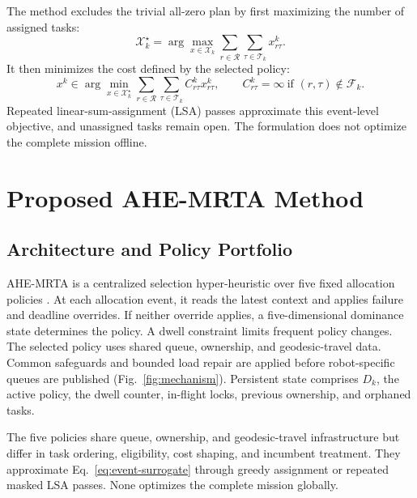 \documentclass[10pt,letterpaper,onecolumn]{IEEEtran}
\begin{document}
The method excludes the trivial all-zero plan by first maximizing the number
of assigned tasks:
\begin{equation}
  \mathcal X_k^\star=\arg\max_{x\in\mathcal X_k}
  \sum_{r\in\mathcal R}\sum_{\tau\in\mathcal T_k}x_{r\tau}^k.
  \label{eq:max-cardinality}
\end{equation}
It then minimizes the cost defined by the selected policy:
\begin{equation}
  x^k\in\arg\min_{x\in\mathcal{X}_k^\star}
        \sum_{r\in\mathcal{R}}\sum_{\tau\in\mathcal{T}_k}
        C_{r\tau}^k x_{r\tau}^k ,
  \qquad C_{r\tau}^k=\infty\ \text{if }(r,\tau)\notin\mathcal{F}_k .
  \label{eq:event-surrogate}
\end{equation}
Repeated linear-sum-assignment (LSA) passes approximate this event-level
objective, and unassigned tasks remain open. The formulation does not optimize
the complete mission offline.

\section{Proposed AHE-MRTA Method}
\label{sec:method}

\subsection{Architecture and Policy Portfolio}
\label{sec:method-overview}

AHE-MRTA is a centralized selection hyper-heuristic over five fixed allocation
policies \cite{burke2013hyper}. At each allocation event, it reads the latest
context and applies failure and deadline overrides. If neither override
applies, a five-dimensional dominance state determines the policy. A dwell
constraint limits frequent policy changes. The selected policy uses shared
queue, ownership, and geodesic-travel data. Common safeguards and bounded load
repair are applied before robot-specific queues are published
(Fig.~\ref{fig:mechanism}). Persistent state comprises $D_k$, the active
policy, the dwell counter, in-flight locks, previous ownership, and orphaned
tasks.

\label{sec:paradigms}

The five policies share queue, ownership, and geodesic-travel infrastructure
but differ in task ordering, eligibility, cost shaping, and incumbent
treatment. They approximate Eq.~\eqref{eq:event-surrogate} through greedy
assignment or repeated masked LSA passes. None optimizes the complete mission
globally.
\end{document}
